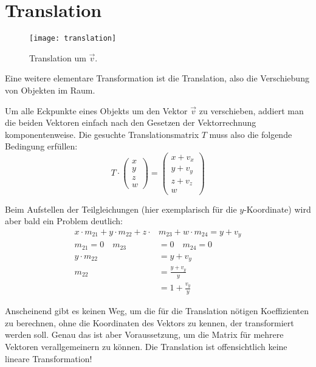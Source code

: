 \section{Translation}
\label{translation}

\begin{wrapfigure}{R}{0.5\textwidth}
  \texttt{[image: translation]}
  \vspace{-15pt}
  \caption{Translation um $\vec v$.}
\end{wrapfigure}

Eine weitere elementare Transformation ist die Translation, also die Verschiebung von Objekten im Raum.

Um alle Eckpunkte eines Objekts um den Vektor $\vec v$ zu verschieben, addiert man die beiden Vektoren einfach nach den Gesetzen der Vektorrechnung komponentenweise. Die gesuchte Translationsmatrix $T$ muss also die folgende Bedingung erfüllen:
\begin{equation}
 T \cdot 
 \begin{pmatrix}
  x \\
  y \\
  z \\
  w
 \end{pmatrix}
 =
 \begin{pmatrix}
  x + v_x \\
  y + v_y \\
  z + v_z \\
  w
 \end{pmatrix}
\end{equation}

Beim Aufstellen der Teilgleichungen (hier exemplarisch für die $y$-Koordinate) wird aber bald ein Problem deutlich:
\begin{equation}
\begin{split}
 x \cdot m_{21} + y \cdot m_{22} + z \cdot & m_{23} + w \cdot m_{24} = y + v_y \\
 m_{21} = 0 \quad m_{23} &= 0 \quad m_{24} = 0 \\
 y \cdot m_{22} & = y + v_y \\
 m_{22} & = \frac{y + v_y}{y} \\
 & = 1 + \frac{v_y}{y}
\end{split}
\end{equation}

Anscheinend gibt es keinen Weg, um die für die Translation nötigen Koeffizienten zu berechnen, ohne die Koordinaten des Vektors zu kennen, der transformiert werden soll. Genau das ist aber Voraussetzung, um die Matrix für mehrere Vektoren verallgemeinern zu können. Die Translation ist offensichtlich keine lineare Transformation!

